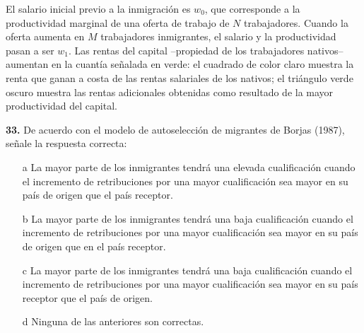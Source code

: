 \documentclass{nuevotema}
\begin{document}
El salario inicial previo a la inmigración es $w_0$, que corresponde a la productividad marginal de una oferta de trabajo de $N$ trabajadores. Cuando la oferta aumenta en $M$ trabajadores inmigrantes, el salario y la productividad pasan a ser $w_1$. Las rentas del capital --propiedad de los trabajadores nativos-- aumentan en la cuantía señalada en verde: el cuadrado de color claro muestra la renta que ganan a costa de las rentas salariales de los nativos; el triángulo verde oscuro muestra las rentas adicionales obtenidas como resultado de la mayor productividad del capital.

\conceptos


\preguntas

%
%


\textbf{33.} De acuerdo con el modelo de autoselección de migrantes de Borjas (1987), señale la respuesta correcta:

\begin{itemize}
	\item[a] La mayor parte de los inmigrantes tendrá una elevada cualificación cuando el incremento de retribuciones por una mayor cualificación sea mayor en su país de origen que el país receptor.
	\item[b] La mayor parte de los inmigrantes tendrá una baja cualificación cuando el incremento de retribuciones por una mayor cualificación sea mayor en su país de origen que en el país receptor.
	\item[c] La mayor parte de los inmigrantes tendrá una baja cualificación cuando el incremento de retribuciones por una mayor cualificación sea mayor en su país receptor que el país de origen.
	\item[d] Ninguna de las anteriores son correctas.
\end{itemize}
\end{document}
